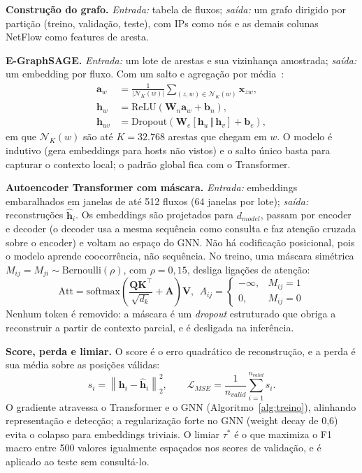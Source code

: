 \documentclass[conference]{IEEEtran}
\newcommand{\vect}[1]{\mathbf{#1}}
\newcommand{\norm}[1]{\left\lVert #1 \right\rVert}
\begin{document}
\textbf{Construção do grafo.} \emph{Entrada:} tabela de fluxos; \emph{saída:} um
grafo dirigido por partição (treino, validação, teste), com IPs como nós e as
demais colunas NetFlow como features de aresta.

\textbf{E-GraphSAGE.} \emph{Entrada:} um lote de arestas e sua vizinhança
amostrada; \emph{saída:} um embedding por fluxo. Com um salto e agregação por
média~\cite{lo2022egraphsage}:
\begin{align}
\vect{a}_w &= \frac{1}{|\mathcal{N}_K(w)|}\sum_{(z,w)\in\mathcal{N}_K(w)} \vect{x}_{zw}, \label{eq:agg}\\
\vect{h}_w &= \mathrm{ReLU}\left(\vect{W}_n\vect{a}_w+\vect{b}_n\right),\\
\vect{h}_{uv} &= \mathrm{Dropout}\left(\vect{W}_e\left[\vect{h}_u \,\Vert\, \vect{h}_v\right]+\vect{b}_e\right), \label{eq:edge}
\end{align}
em que $\mathcal{N}_K(w)$ são até $K=32.768$ arestas que chegam em $w$. O modelo
é indutivo (gera embeddings para hosts não vistos) e o salto único basta para
capturar o contexto local; o padrão global fica com o Transformer.

\textbf{Autoencoder Transformer com máscara.} \emph{Entrada:} embeddings
embaralhados em janelas de até 512 fluxos (64 janelas por lote); \emph{saída:}
reconstruções $\hat{\vect{h}}_i$. Os embeddings são projetados para
$d_{model}$, passam por encoder e decoder (o decoder usa a mesma sequência como
consulta e faz atenção cruzada sobre o encoder) e voltam ao espaço do GNN. Não há
codificação posicional, pois o modelo aprende coocorrência, não sequência. No
treino, uma máscara simétrica $M_{ij}=M_{ji}\sim\mathrm{Bernoulli}(\rho)$, com
$\rho=0{,}15$, desliga ligações de atenção:
\begin{equation}
\mathrm{Att}=\mathrm{softmax}\left(\frac{\vect{Q}\vect{K}^\top}{\sqrt{d_k}}+\vect{A}\right)\vect{V},\ \
A_{ij}=\begin{cases}-\infty, & M_{ij}=1\\ 0, & M_{ij}=0\end{cases}
\end{equation}
Nenhum token é removido: a máscara é um \emph{dropout} estruturado que obriga a
reconstruir a partir de contexto parcial, e é desligada na inferência.

\textbf{Score, perda e limiar.} O score é o erro quadrático de reconstrução, e a
perda é sua média sobre as posições válidas:
\begin{equation}
s_i=\norm{\vect{h}_i-\hat{\vect{h}}_i}_2^2,\qquad
\mathcal{L}_{MSE}=\frac{1}{n_{valid}}\sum_{i=1}^{n_{valid}} s_i. \label{eq:loss}
\end{equation}
O gradiente atravessa o Transformer e o GNN (Algoritmo~\ref{alg:treino}),
alinhando representação e detecção; a regularização forte no GNN (weight decay
de 0,6) evita o colapso para embeddings triviais. O limiar $\tau^\ast$ é o que
maximiza o F1 macro entre 500 valores igualmente espaçados nos scores de
validação, e é aplicado ao teste sem consultá-lo.
\end{document}

